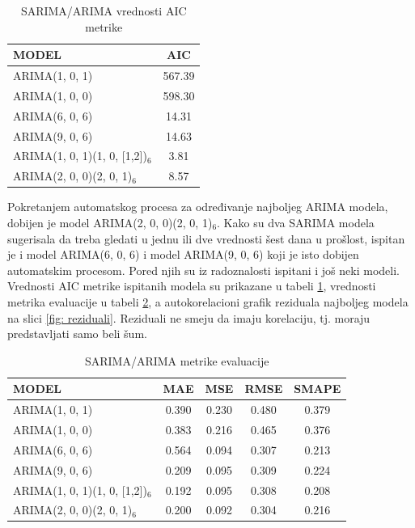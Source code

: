\documentclass[12pt,oneside]{memoir}
\begin{document}
\begin{table}[!ht]
\centering
\caption{SARIMA/ARIMA vrednosti AIC metrike}
\label{tbl: arime_aic}
\begin{tabular}{ |l|c| } 
\hline
MODEL & AIC \\
\hline
ARIMA(1, 0, 1) & 567.39\\ 
ARIMA(1, 0, 0) & 598.30\\ 
ARIMA(6, 0, 6) & 14.31\\ 
ARIMA(9, 0, 6) & 14.63\\
ARIMA(1, 0, 1)(1, 0, [1,2])$_6$ & 3.81\\
ARIMA(2, 0, 0)(2, 0, 1)$_6$ & 8.57\\
\hline
\end{tabular}
\end{table}

Pokretanjem automatskog procesa za određivanje najboljeg ARIMA modela, dobijen je model ARIMA(2, 0, 0)(2, 0, 1)$_6$. Kako su dva SARIMA modela sugerisala da treba gledati u jednu ili dve vrednosti šest dana u prošlost, ispitan je i model ARIMA(6, 0, 6) i model ARIMA(9, 0, 6) koji je isto dobijen automatskim procesom. Pored njih su iz radoznalosti ispitani i još neki modeli. Vrednosti AIC metrike ispitanih modela su prikazane u tabeli \ref{tbl: arime_aic}, vrednosti metrika evaluacije u tabeli \ref{tbl: arime_metrike}, a autokorelacioni grafik reziduala najboljeg modela na slici \ref{fig: reziduali}. Reziduali ne smeju da imaju korelaciju, tj. moraju predstavljati samo beli šum.

\begin{table}[!ht]
\centering
\caption{SARIMA/ARIMA metrike evaluacije}
\label{tbl: arime_metrike}
\begin{tabular}{ |l|c|c|c|c|} 
\hline
MODEL & MAE & MSE & RMSE & SMAPE \\
\hline
ARIMA(1, 0, 1) & 0.390 & 0.230 & 0.480 & 0.379 \\ 
ARIMA(1, 0, 0) & 0.383 & 0.216 & 0.465 & 0.376\\ 
ARIMA(6, 0, 6) & 0.564 & 0.094 & 0.307 & 0.213\\ 
ARIMA(9, 0, 6) & 0.209 & 0.095 & 0.309 & 0.224\\ 
ARIMA(1, 0, 1)(1, 0, [1,2])$_6$ & 0.192 & 0.095 & 0.308 & 0.208\\
ARIMA(2, 0, 0)(2, 0, 1)$_6$ & 0.200 & 0.092 & 0.304 & 0.216\\
\hline
\end{tabular}
\end{table}
\end{document}
